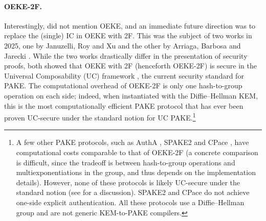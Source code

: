 \documentclass{article}
\theoremstyle{plain}
\theoremstyle{definition}
\theoremstyle{remark}
\begin{document}
\paragraph{OEKE-2F.}
Interestingly, \cite{CCS:McQRosRoy20} did not mention OEKE, and an immediate future direction was to replace the (single) IC in OEKE with 2F. This was the subject of two works in 2025, one by Januzelli, Roy and Xu \cite{EC:JanRoyXu25} and the other by Arriaga, Barbosa and Jarecki \cite{EPRINT:ArrBarJar25}. While the two works drastically differ in the presentation of security proofs, both showed that OEKE with 2F (henceforth OEKE-2F) is secure in the Universal Composability (UC) framework \cite{FOCS:Canetti01}, the current security standard for PAKE. The computational overhead of OEKE-2F is only one hash-to-group operation on each side; indeed, when instantiated with the Diffie--Hellman KEM, this is the most computationally efficient PAKE protocol that has ever been proven UC-secure under the standard notion for UC PAKE.\footnote{A few other PAKE protocols, such as AuthA \cite{PKC:BreChePoi04}, SPAKE2 \cite{RSA:AbdPoi05} and CPace \cite{TCHES:BjoBen19}, have computational costs comparable to that of OEKE-2F (a concrete comparison is difficult, since the tradeoff is between hash-to-group operations and multiexponentiations in the group, and thus depends on the implementation details). However, none of these protocols is likely UC-secure under the standard notion (see \cite[Section~1]{C:ABBJKX20} for a discussion). SPAKE2 and CPace do not achieve one-side explicit authentication. All these protocols use a Diffie--Hellman group and are not generic KEM-to-PAKE compilers.}
\end{document}
